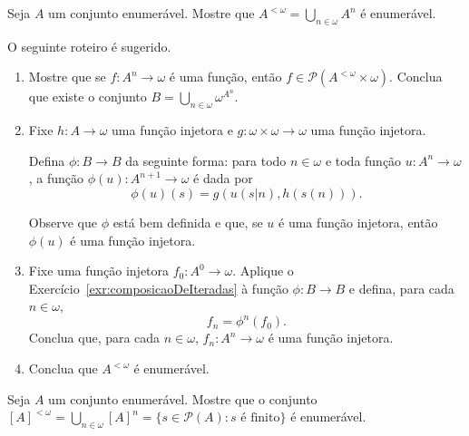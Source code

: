 \begin{exercise}
    Seja $A$ um conjunto enumerável.
    Mostre que $A^{<\omega}=\bigcup_{n\in\omega} A^n$ é enumerável.

    O seguinte roteiro é sugerido.
    
    \begin{enumerate}
        \item Mostre que se $f:A^n\rightarrow \omega$ é uma função, então $f \in \mathcal P(A^{<\omega}\times \omega)$.
        Conclua que existe o conjunto $B=\bigcup_{n\in\omega}\omega^{A^n}$.

        \item Fixe $h:A\to \omega$ uma função injetora e $g:\omega\times\omega\to \omega$ uma função injetora.

        Defina $\phi:B\to B$ da seguinte forma: para todo $n\in \omega$ e toda função $u:A^n\to \omega$,
        a função $\phi(u):A^{n+1}\to \omega$ é dada por
        \[
            \phi(u)(s)=g(u(s|n),h(s(n))).
        \]

        Observe que $\phi$ está bem definida e que, se $u$ é uma função injetora, então $\phi(u)$ é uma função injetora.

        \item Fixe uma função injetora $f_0:A^0\to \omega$.
        Aplique o Exercício~\ref{exr:composicaoDeIteradas} à função $\phi:B\to B$ e defina, para cada $n\in\omega$,
        \[
            f_n=\phi^n(f_0).
        \]
        Conclua que, para cada $n\in\omega$, $f_n:A^n\to \omega$ é uma função injetora.
        \item Conclua que $A^{<\omega}$ é enumerável.
    \end{enumerate}
\end{exercise}

\begin{exercise}
    Seja $A$ um conjunto enumerável.
    Mostre que o conjunto $[A]^{<\omega}=\bigcup_{n\in\omega}[A]^n=\{s \in \mathcal P(A) : s \text{ é finito}\}$ é enumerável.
\end{exercise}

